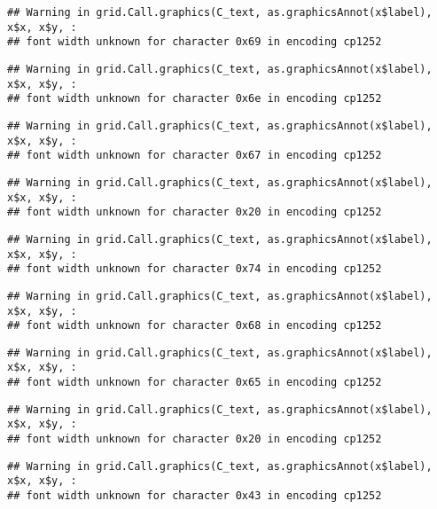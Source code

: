 \documentclass[
]{article}
\begin{document}
\begin{verbatim}
## Warning in grid.Call.graphics(C_text, as.graphicsAnnot(x$label), x$x, x$y, :
## font width unknown for character 0x69 in encoding cp1252
\end{verbatim}

\begin{verbatim}
## Warning in grid.Call.graphics(C_text, as.graphicsAnnot(x$label), x$x, x$y, :
## font width unknown for character 0x6e in encoding cp1252
\end{verbatim}

\begin{verbatim}
## Warning in grid.Call.graphics(C_text, as.graphicsAnnot(x$label), x$x, x$y, :
## font width unknown for character 0x67 in encoding cp1252
\end{verbatim}

\begin{verbatim}
## Warning in grid.Call.graphics(C_text, as.graphicsAnnot(x$label), x$x, x$y, :
## font width unknown for character 0x20 in encoding cp1252
\end{verbatim}

\begin{verbatim}
## Warning in grid.Call.graphics(C_text, as.graphicsAnnot(x$label), x$x, x$y, :
## font width unknown for character 0x74 in encoding cp1252
\end{verbatim}

\begin{verbatim}
## Warning in grid.Call.graphics(C_text, as.graphicsAnnot(x$label), x$x, x$y, :
## font width unknown for character 0x68 in encoding cp1252
\end{verbatim}

\begin{verbatim}
## Warning in grid.Call.graphics(C_text, as.graphicsAnnot(x$label), x$x, x$y, :
## font width unknown for character 0x65 in encoding cp1252
\end{verbatim}

\begin{verbatim}
## Warning in grid.Call.graphics(C_text, as.graphicsAnnot(x$label), x$x, x$y, :
## font width unknown for character 0x20 in encoding cp1252
\end{verbatim}

\begin{verbatim}
## Warning in grid.Call.graphics(C_text, as.graphicsAnnot(x$label), x$x, x$y, :
## font width unknown for character 0x43 in encoding cp1252
\end{verbatim}
\end{document}
